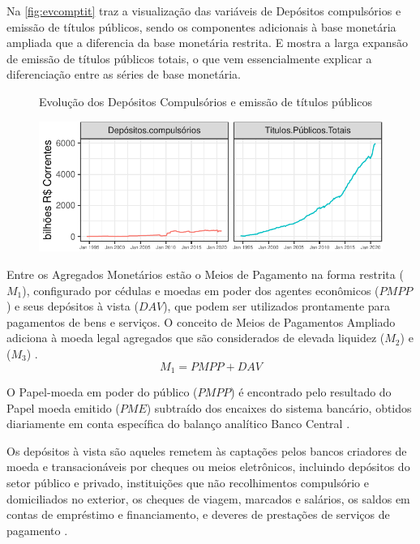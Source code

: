 \documentclass[12pt,12pt,openright,oneside,a4paper,chapter=TITLE,section=TITLE,subsection=TITLE,subsubsection=TITLE,english,french,spanish,portugues,sumario=tradicional]{abntex2}
\begin{document}
Na \autoref{fig:evcomptit} traz a visualização das variáveis de Depósitos compulsórios e emissão de títulos públicos, sendo os componentes adicionais à base monetária ampliada que a diferencia da base monetária restrita. E mostra a larga expansão de emissão de títulos públicos totais, o que vem essencialmente explicar a diferenciação entre as séries de base monetária.

\begin{figure}
 {Evolução dos Depósitos Compulsórios e emissão de títulos públicos}

\begin{center}\includegraphics{12-exportedfigures/base components-1} \end{center}
\label{fig:evcomptit}
\end{figure}

Entre os Agregados Monetários estão o Meios de Pagamento na forma restrita (\(M_1\)), configurado por cédulas e moedas em poder dos agentes econômicos (\(PMPP\)) e seus depósitos à vista (\(DAV\)), que podem ser utilizados prontamente para pagamentos de bens e serviços. O conceito de Meios de Pagamentos Ampliado adiciona à moeda legal agregados que são considerados de elevada liquidez (\(M_2\)) e (\(M_3\)) \cite{bcb:2019} \cite{sgs:mpa}.
\[
M_1 = PMPP + DAV
\]

O Papel-moeda em poder do público (\(PMPP\)) é encontrado pelo resultado do Papel moeda emitido (\(PME\)) subtraído dos encaixes do sistema bancário, obtidos diariamente em conta específica do balanço analítico Banco Central \cite{sgs:m1}.

Os depósitos à vista são aqueles remetem às captações pelos bancos criadores de moeda e transacionáveis por cheques ou meios eletrônicos, incluindo depósitos do setor público e privado, instituições que não recolhimentos compulsório e domiciliados no exterior, os cheques de viagem, marcados e salários, os saldos em contas de empréstimo e financiamento, e deveres de prestações de serviços de pagamento \cite{sgs:m1}.
\end{document}
